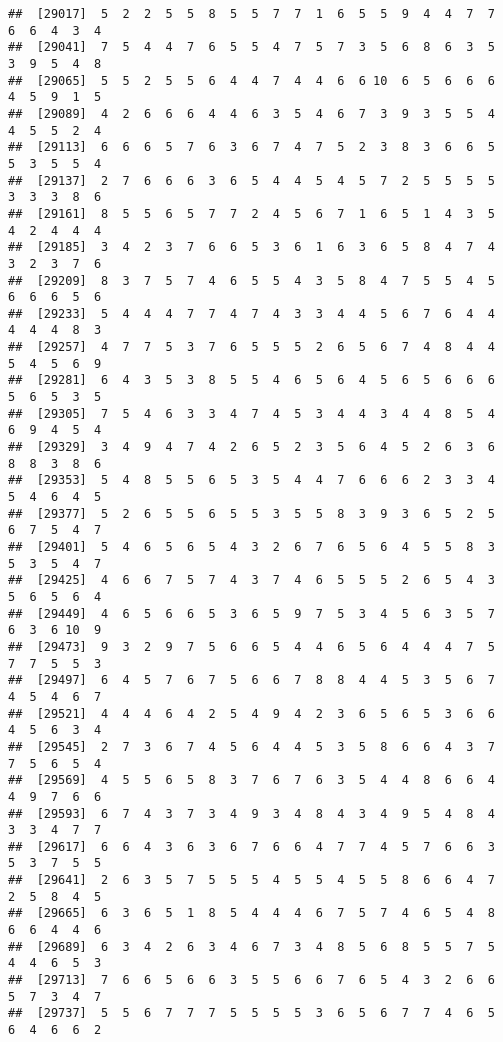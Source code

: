 \documentclass[
]{book}
\begin{document}
\begin{verbatim}
##  [29017]  5  2  2  5  5  8  5  5  7  7  1  6  5  5  9  4  4  7  7  6  6  4  3  4
##  [29041]  7  5  4  4  7  6  5  5  4  7  5  7  3  5  6  8  6  3  5  3  9  5  4  8
##  [29065]  5  5  2  5  5  6  4  4  7  4  4  6  6 10  6  5  6  6  6  4  5  9  1  5
##  [29089]  4  2  6  6  6  4  4  6  3  5  4  6  7  3  9  3  5  5  4  4  5  5  2  4
##  [29113]  6  6  6  5  7  6  3  6  7  4  7  5  2  3  8  3  6  6  5  5  3  5  5  4
##  [29137]  2  7  6  6  6  3  6  5  4  4  5  4  5  7  2  5  5  5  5  3  3  3  8  6
##  [29161]  8  5  5  6  5  7  7  2  4  5  6  7  1  6  5  1  4  3  5  4  2  4  4  4
##  [29185]  3  4  2  3  7  6  6  5  3  6  1  6  3  6  5  8  4  7  4  3  2  3  7  6
##  [29209]  8  3  7  5  7  4  6  5  5  4  3  5  8  4  7  5  5  4  5  6  6  6  5  6
##  [29233]  5  4  4  4  7  7  4  7  4  3  3  4  4  5  6  7  6  4  4  4  4  4  8  3
##  [29257]  4  7  7  5  3  7  6  5  5  5  2  6  5  6  7  4  8  4  4  5  4  5  6  9
##  [29281]  6  4  3  5  3  8  5  5  4  6  5  6  4  5  6  5  6  6  6  5  6  5  3  5
##  [29305]  7  5  4  6  3  3  4  7  4  5  3  4  4  3  4  4  8  5  4  6  9  4  5  4
##  [29329]  3  4  9  4  7  4  2  6  5  2  3  5  6  4  5  2  6  3  6  8  8  3  8  6
##  [29353]  5  4  8  5  5  6  5  3  5  4  4  7  6  6  6  2  3  3  4  5  4  6  4  5
##  [29377]  5  2  6  5  5  6  5  5  3  5  5  8  3  9  3  6  5  2  5  6  7  5  4  7
##  [29401]  5  4  6  5  6  5  4  3  2  6  7  6  5  6  4  5  5  8  3  5  3  5  4  7
##  [29425]  4  6  6  7  5  7  4  3  7  4  6  5  5  5  2  6  5  4  3  5  6  5  6  4
##  [29449]  4  6  5  6  6  5  3  6  5  9  7  5  3  4  5  6  3  5  7  6  3  6 10  9
##  [29473]  9  3  2  9  7  5  6  6  5  4  4  6  5  6  4  4  4  7  5  7  7  5  5  3
##  [29497]  6  4  5  7  6  7  5  6  6  7  8  8  4  4  5  3  5  6  7  4  5  4  6  7
##  [29521]  4  4  4  6  4  2  5  4  9  4  2  3  6  5  6  5  3  6  6  4  5  6  3  4
##  [29545]  2  7  3  6  7  4  5  6  4  4  5  3  5  8  6  6  4  3  7  7  5  6  5  4
##  [29569]  4  5  5  6  5  8  3  7  6  7  6  3  5  4  4  8  6  6  4  4  9  7  6  6
##  [29593]  6  7  4  3  7  3  4  9  3  4  8  4  3  4  9  5  4  8  4  3  3  4  7  7
##  [29617]  6  6  4  3  6  3  6  7  6  6  4  7  7  4  5  7  6  6  3  5  3  7  5  5
##  [29641]  2  6  3  5  7  5  5  5  4  5  5  4  5  5  8  6  6  4  7  2  5  8  4  5
##  [29665]  6  3  6  5  1  8  5  4  4  4  6  7  5  7  4  6  5  4  8  6  6  4  4  6
##  [29689]  6  3  4  2  6  3  4  6  7  3  4  8  5  6  8  5  5  7  5  4  4  6  5  3
##  [29713]  7  6  6  5  6  6  3  5  5  6  6  7  6  5  4  3  2  6  6  5  7  3  4  7
##  [29737]  5  5  6  7  7  7  5  5  5  5  3  6  5  6  7  7  4  6  5  6  4  6  6  2

\end{verbatim}
\end{document}
